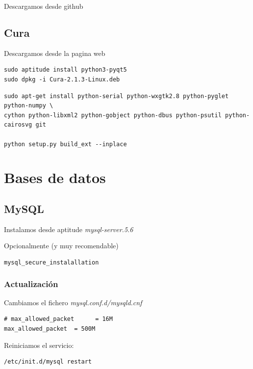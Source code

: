 \documentclass[12pt,spanish,]{article}
\begin{document}
Descargamos desde github

\subsection{Cura}\label{cura}

Descargamos desde la pagina web

\begin{verbatim}
sudo aptitude install python3-pyqt5
sudo dpkg -i Cura-2.1.3-Linux.deb
\end{verbatim}

\begin{verbatim}
sudo apt-get install python-serial python-wxgtk2.8 python-pyglet python-numpy \
cython python-libxml2 python-gobject python-dbus python-psutil python-cairosvg git

python setup.py build_ext --inplace
\end{verbatim}

\section{Bases de datos}\label{bases-de-datos}

\subsection{MySQL}\label{mysql}

Instalamos desde aptitude \emph{mysql-server.5.6}

Opcionalmente (y muy recomendable)

\begin{verbatim}
mysql_secure_instalallation
\end{verbatim}

\subsubsection{Actualización}\label{actualizaciuxf3n}

Cambiamos el fichero \emph{mysql.conf.d/mysqld.cnf}

\begin{verbatim}
# max_allowed_packet      = 16M
max_allowed_packet  = 500M
\end{verbatim}

Reiniciamos el servicio:

\begin{verbatim}
/etc/init.d/mysql restart
\end{verbatim}
\end{document}

